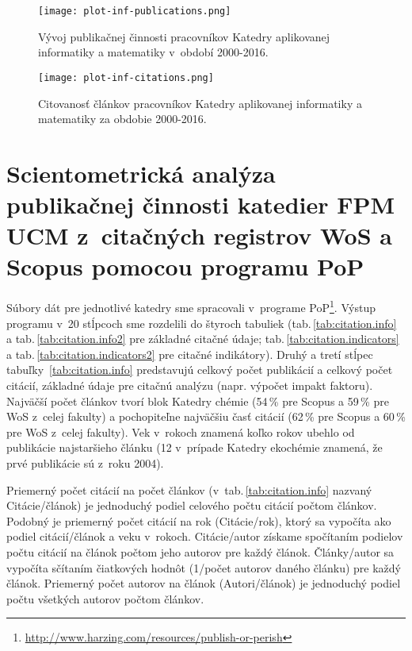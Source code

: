 \begin{figure}
  \centering
  \texttt{[image: plot-inf-publications.png]}
  \caption{Vývoj publikačnej činnosti pracovníkov Katedry aplikovanej
    informatiky a matematiky v~období 2000-2016.}
  \label{fig:plot.inf.publications}
\end{figure}

\begin{figure}
  \centering
  \texttt{[image: plot-inf-citations.png]}
  \caption{Citovanosť článkov pracovníkov Katedry aplikovanej informatiky a
    matematiky za obdobie 2000-2016.}
  \label{fig:plot.inf.citations}
\end{figure}


\section{Scientometrická analýza publikačnej činnosti katedier FPM UCM
  z~citačných registrov WoS a Scopus pomocou programu PoP}

Súbory dát pre jednotlivé katedry sme spracovali v~programe
PoP\footnote{\url{http://www.harzing.com/resources/publish-or-perish}}.  Výstup
programu v~20 stĺpcoch sme rozdelili do štyroch tabuliek
(tab.\,\ref{tab:citation.info} a tab.\,\ref{tab:citation.info2} pre základné
citačné údaje; tab.\,\ref{tab:citation.indicators} a
tab.\,\ref{tab:citation.indicators2} pre citačné indikátory).  Druhý a tretí
stĺpec tabuľky~\ref{tab:citation.info} predstavujú celkový počet publikácií a
celkový počet citácií, základné údaje pre citačnú analýzu (napr. výpočet impakt
faktoru).  Najväčší počet článkov tvorí blok Katedry chémie (54\,\% pre Scopus a
59\,\% pre WoS z~celej fakulty) a pochopiteľne najväčšiu časť citácií (62\,\%
pre Scopus a 60\,\% pre WoS z~celej fakulty).  Vek v~rokoch znamená koľko rokov
ubehlo od publikácie najstaršieho článku (12 v~prípade Katedry ekochémie
znamená, že prvé publikácie sú z~roku 2004).

Priemerný počet citácií na počet článkov (v~tab.\,\ref{tab:citation.info}
nazvaný Citácie/článok) je jednoduchý podiel celového počtu citácií počtom
článkov.  Podobný je priemerný počet citácií na rok (Citácie/rok), ktorý sa
vypočíta ako podiel citácií/článok a veku v~rokoch.  Citácie/autor získame
spočítaním podielov počtu citácií na článok počtom jeho autorov pre každý
článok.  Články/autor sa vypočíta sčítaním čiatkových hodnôt (1/počet autorov
daného článku) pre každý článok.  Priemerný počet autorov na článok
(Autori/článok) je jednoduchý podiel počtu všetkých autorov počtom článkov.
\citep{Harzing2011}

